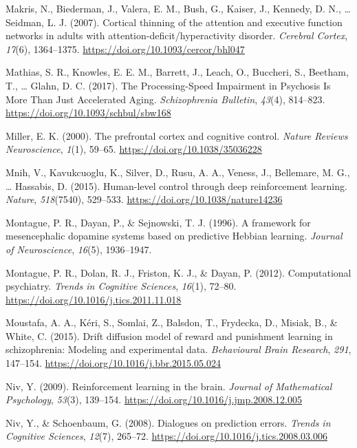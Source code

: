 \documentclass[12pt,openany]{book}
\theoremstyle{definition}
\theoremstyle{definition}
\theoremstyle{definition}
\theoremstyle{remark}
\begin{document}
\hypertarget{ref-Makris2007}{}
Makris, N., Biederman, J., Valera, E. M., Bush, G., Kaiser, J., Kennedy,
D. N., \ldots{} Seidman, L. J. (2007). Cortical thinning of the
attention and executive function networks in adults with
attention-deficit/hyperactivity disorder. \emph{Cerebral Cortex},
\emph{17}(6), 1364--1375. \url{https://doi.org/10.1093/cercor/bhl047}

\hypertarget{ref-Mathias2017}{}
Mathias, S. R., Knowles, E. E. M., Barrett, J., Leach, O., Buccheri, S.,
Beetham, T., \ldots{} Glahn, D. C. (2017). The Processing-Speed
Impairment in Psychosis Is More Than Just Accelerated Aging.
\emph{Schizophrenia Bulletin}, \emph{43}(4), 814--823.
\url{https://doi.org/10.1093/schbul/sbw168}

\hypertarget{ref-Miller2000}{}
Miller, E. K. (2000). The prefrontal cortex and cognitive control.
\emph{Nature Reviews Neuroscience}, \emph{1}(1), 59--65.
\url{https://doi.org/10.1038/35036228}

\hypertarget{ref-Mnih2015}{}
Mnih, V., Kavukcuoglu, K., Silver, D., Rusu, A. A., Veness, J.,
Bellemare, M. G., \ldots{} Hassabis, D. (2015). Human-level control
through deep reinforcement learning. \emph{Nature}, \emph{518}(7540),
529--533. \url{https://doi.org/10.1038/nature14236}

\hypertarget{ref-Montague1996}{}
Montague, P. R., Dayan, P., \& Sejnowski, T. J. (1996). A framework for
mesencephalic dopamine systems based on predictive Hebbian learning.
\emph{Journal of Neuroscience}, \emph{16}(5), 1936--1947.

\hypertarget{ref-Montague2012b}{}
Montague, P. R., Dolan, R. J., Friston, K. J., \& Dayan, P. (2012).
Computational psychiatry. \emph{Trends in Cognitive Sciences},
\emph{16}(1), 72--80. \url{https://doi.org/10.1016/j.tics.2011.11.018}

\hypertarget{ref-Moustafa2015}{}
Moustafa, A. A., Kéri, S., Somlai, Z., Balsdon, T., Frydecka, D.,
Misiak, B., \& White, C. (2015). Drift diffusion model of reward and
punishment learning in schizophrenia: Modeling and experimental data.
\emph{Behavioural Brain Research}, \emph{291}, 147--154.
\url{https://doi.org/10.1016/j.bbr.2015.05.024}

\hypertarget{ref-Niv2009}{}
Niv, Y. (2009). Reinforcement learning in the brain. \emph{Journal of
Mathematical Psychology}, \emph{53}(3), 139--154.
\url{https://doi.org/10.1016/j.jmp.2008.12.005}

\hypertarget{ref-Niv2008}{}
Niv, Y., \& Schoenbaum, G. (2008). Dialogues on prediction errors.
\emph{Trends in Cognitive Sciences}, \emph{12}(7), 265--72.
\url{https://doi.org/10.1016/j.tics.2008.03.006}
\end{document}
